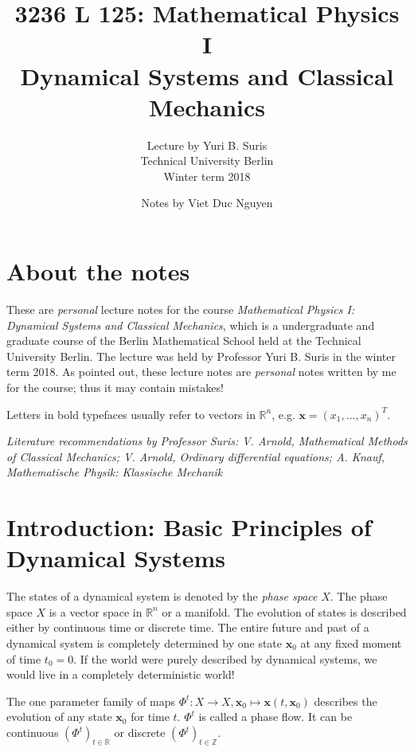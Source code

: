 \documentclass[hidelinks,a4paper, 11pt]{article}
\theoremstyle{plain}
\theoremstyle{break}
\theoremstyle{plain}
\theoremstyle{definition}
\begin{document}
\title{3236 L 125: Mathematical Physics I\\ \large{Dynamical Systems and Classical Mechanics} }
\author{Lecture by Yuri B. Suris \\ Technical University Berlin \\ Winter term 2018}
\date{ Notes by Viet Duc Nguyen}

\maketitle
\tableofcontents

\setcounter{section}{-1}
\section{About the notes}
These are \emph{personal} lecture notes for the course \emph{Mathematical Physics I: Dynamical Systems and Classical Mechanics}, which is a undergraduate and graduate course of the Berlin Mathematical School held at the Technical University Berlin. The lecture was held by Professor Yuri B. Suris in the winter term 2018. As pointed out, these lecture notes are \emph{personal} notes written by me for the course; thus it may contain mistakes!

Letters in bold typefaces usually refer to vectors in $\mathbb R^n$, e.g. $\mathbf x = (x_1,...,x_n)^T$.

\textit{Literature recommendations by Professor Suris: V. Arnold, Mathematical Methods of Classical Mechanics; V. Arnold, Ordinary differential equations; A. Knauf, Mathematische Physik: Klassische Mechanik}

\section{Introduction: Basic Principles of Dynamical Systems}

The states of a dynamical system is denoted by the \emph{phase space} $X$. The phase space $X$ is a vector space in $\mathbb R^n$ or a manifold. The evolution of states is described either by continuous time or discrete time. The entire future and past of a dynamical system is completely determined by one state $\mathbf x_0$ at any fixed moment of time $t_0 = 0$. If the world were purely described by dynamical systems, we would live in a completely deterministic world!

The one parameter family of maps $\Phi^t: X \to X, \mathbf x_0 \mapsto \mathbf x(t,\mathbf x_0)$ describes the evolution of any state $\mathbf x_0$ for time $t$. $\Phi^t$ is called a phase flow. It can be continuous $(\Phi^t)_{t \in \mathbb R}$ or discrete $(\Phi^t)_{t \in \mathbb Z}$.
\end{document}
